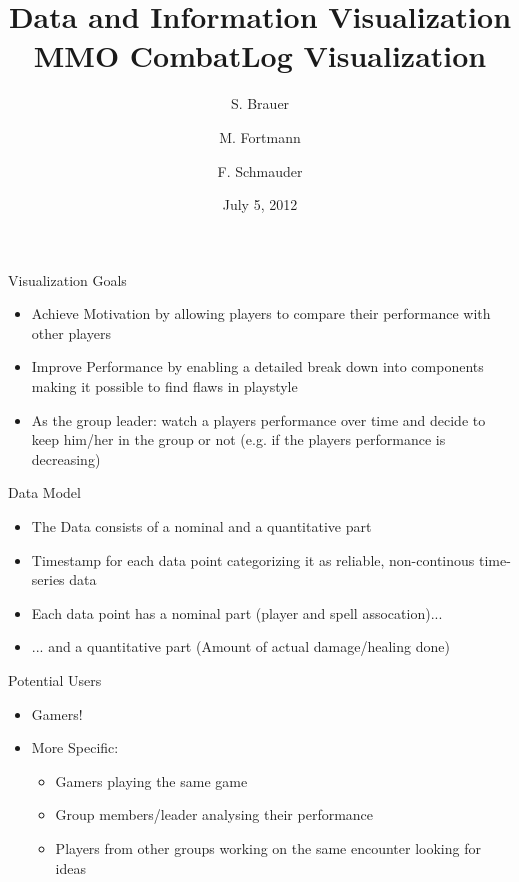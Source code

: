 \documentclass{beamer}
\title[Project Presentation]{Data and Information Visualization \\ MMO CombatLog Visualization}
\author[Brauer, Fortmann, Schmauder]
{S. Brauer \and M. Fortmann \and F. Schmauder}
\institute[UPB]{Institute for Computer Science}
\date{July 5, 2012}
\begin{document}
\begin{frame}
  \titlepage
\end{frame}

\begin{frame}{Visualization Goals}
\begin{itemize}
	\item Achieve Motivation by allowing players to compare their performance with other players 
	\item Improve Performance by enabling a detailed break down into components making it possible to find flaws in playstyle
	\item As the group leader: watch a players performance over time and decide to keep him/her in the group or not (e.g. if the players performance is decreasing)
\end{itemize}
\end{frame}

\begin{frame}{Data Model}
\begin{itemize}
	\item The Data consists of a nominal and a quantitative part
	\item Timestamp for each data point categorizing it as reliable, non-continous time-series data
	\item Each data point has a nominal part (player and spell assocation)...
	\item ... and a quantitative part (Amount of actual damage/healing done)
\end{itemize}
\end{frame}

\begin{frame}{Potential Users}
\begin{itemize}
	\item Gamers!
	\item More Specific: 
	\begin{itemize}
		\item Gamers playing the same game
		\item Group members/leader analysing their performance
		\item Players from other groups working on the same encounter looking for ideas
	\end{itemize}
\end{itemize}
\end{frame}
\end{document}
